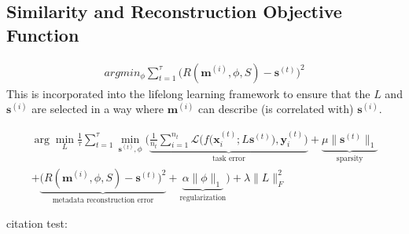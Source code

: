 \documentclass{article} %
\newcommand{\Mt}[1]{\textbf{m}^{(#1)}}
\newcommand{\Dt}[1]{D^{(#1)}}
\newcommand{\st}[1]{\textbf{s}^{(#1)}}
\newcommand{\sthat}[1]{\hat{\textbf{s}}^{(#1)}}
\newcommand{\Th}[1]{\Theta^{(#1)}}
\newcommand{\xit}[2]{\textbf{x}_{#1}^{(#2)}}
\newcommand{\yit}[2]{\textbf{y}_{#1}^{(#2)}}
\newcommand{\learnedset}[1]{\bm{D}_{#1}'}
\newcommand{\reveng}[1]{R(#1)}
\newcommand{\argmin}{\arg\!\min}
\begin{document}
\subsection{Similarity and Reconstruction Objective Function}
\begin{gather}
	argmin_{\phi} \sum_{t=1}^{\tau} \big( \reveng{ \Mt{i}, \phi,  S  }- \st{t}  \big)^2 
\end{gather}
This is incorporated into the lifelong learning framework to ensure that the $L$ and $\st{i}$ are selected in a way where $\Mt{i}$ can describe (is correlated with) $\st{i}$.

%
%


\begin{multline}
	\argmin_{L} \frac{1}{\tau} \sum_{t=1}^\tau 
	\min_{\st{t},\phi} \bigg(    
		 \underbrace{  \frac{1}{n_t}  \sum_{i=1}^{n_t}  \mathcal{L} \Big( f\big(\xit{i}{t};L\st{t} \big) ,\yit{i}{t} \Big)  }_\text{task error} 
		+ \underbrace{  \mu\|\st{t}\|_1  }_\text{sparsity} \\
		+ \underbrace{  \Big(\reveng{ \Mt{i}, \phi,  S  } - \st{t}  \Big)^2  }_\text{metadata reconstruction error}
		+ \underbrace{  \alpha\|\phi\|_1  }_\text{regularization}
	\bigg)  	
	+ \lambda\|L\|_F^2   
\end{multline}






citation test: \cite{Ruvolo2013}





\end{document}

